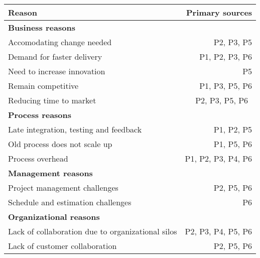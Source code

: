 \centering
{} \label{initreasontable}

\begin{tabular}{l r }
    \hline
    \bfseries{Reason} & \bfseries{Primary sources} \\
    \hline
    \bfseries{Business reasons} \\
    Accomodating change needed & P2, P3, P5 \\
    Demand for faster delivery & P1, P2, P3, P6 \\
    Need to increase innovation & P5 \\
    Remain competitive & P1, P3, P5, P6 \\
    Reducing time to market & P2, P3, P5, P6 \\
    \hline
    \bfseries{Process reasons} \\
    Late integration, testing and feedback & P1, P2, P5 \\
    Old process does not scale up & P1, P5, P6 \\
    Process overhead & P1, P2, P3, P4, P6 \\
    \hline
    \bfseries{Management reasons} \\
    Project management challenges & P2, P5, P6 \\
    Schedule and estimation challenges & P6 \\
    \hline
    \bfseries{Organizational reasons} \\
    Lack of collaboration due to organizational silos & P2, P3, P4, P5, P6 \\
    Lack of customer collaboration & P2, P5, P6 \\
    \hline

\end{tabular}
\justify
